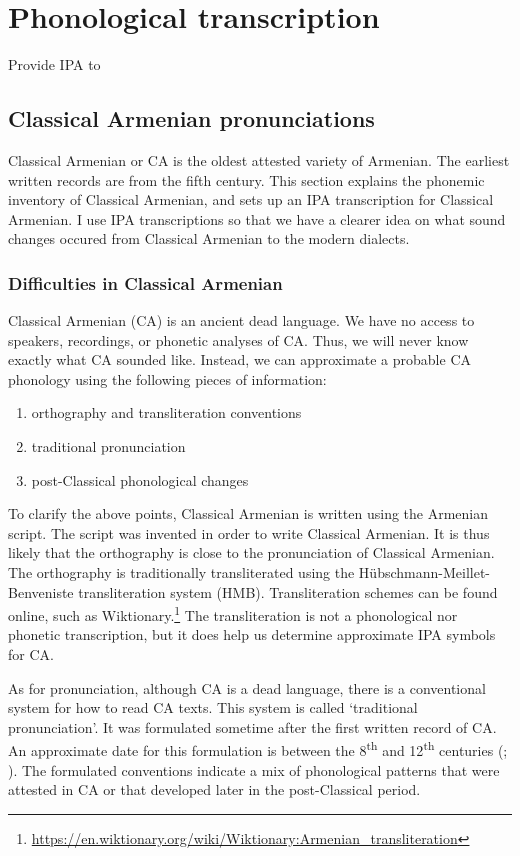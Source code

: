  \section{Phonological transcription}

Provide IPA to 

\subsection{Classical Armenian pronunciations}\label{sec:HossepIntro:phonotransc:CA}

Classical Armenian or CA is the oldest attested variety of Armenian. The earliest written records are from the fifth century. This section explains the phonemic inventory of Classical Armenian, and sets up an IPA transcription for Classical Armenian. I use IPA transcriptions so that we have a clearer idea on what sound changes occured from Classical Armenian to the modern dialects. 

\subsubsection{Difficulties in Classical Armenian}
Classical Armenian (CA) is an ancient dead language. We have no access to speakers, recordings, or phonetic analyses of CA. Thus, we will never know exactly what CA sounded like. Instead, we can approximate a probable CA phonology using the following pieces of information:
\begin{enumerate}
	\item orthography and transliteration conventions
		\item traditional pronunciation
\item post-Classical phonological changes
\end{enumerate}

To clarify the above points, Classical Armenian is written using the Armenian script. The script was invented in order to write Classical Armenian. It is thus likely that the orthography is close to the pronunciation of Classical Armenian.  The orthography is traditionally transliterated using the Hübschmann-Meillet-Benveniste transliteration system (HMB). Transliteration schemes can be found online, such as Wiktionary.\footnote{\url{https://en.wiktionary.org/wiki/Wiktionary:Armenian_transliteration}} The transliteration is not a phonological nor phonetic transcription, but it does help us determine approximate IPA symbols for CA. 

As for pronunciation, although CA is a dead language, there is a conventional system for how to read CA texts. This system is called `traditional pronunciation'. It was formulated sometime after the first written record of CA. An approximate date for this formulation is   between the 8\textsuperscript{th} and 12\textsuperscript{th} centuries  (\citealt[24]{Godel-1975-IntroClassicalArmenian}; \citealt[1039]{Macak-2017-PhonoClassicalArmenian}). The formulated conventions indicate a mix of phonological patterns that were attested in CA or that developed later in the post-Classical period.

